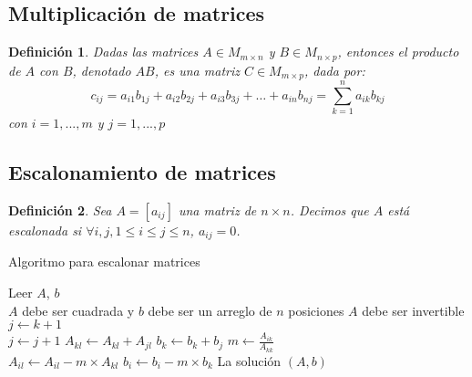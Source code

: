 \documentclass[12pt]{article}
\newtheorem{definition}{Definición}[section]
\begin{document}
        \subsection{Multiplicación de matrices}
        \begin{definition}
            Dadas las matrices $A \in M_{m\times n}$ y $B \in M_{n\times p}$, entonces el producto de $A$ con $B$, denotado $AB$, es una matriz $C \in M_{m\times p}$, dada por: \cite{algebralineal}
            \[
                c_{ij} = a_{i1}b_{1j} + a_{i2}b_{2j} + a_{i3}b_{3j} + \dots + a_{in}b_{nj} = \sum_{k = 1}^{n}{a_{ik}b_{kj}}		
            \]
            con $i = 1, ..., m$ y $j = 1, ..., p$
        \end{definition}

        \subsection{Escalonamiento de matrices}
        \begin{definition}
            Sea $A = [a_{ij}]$ una matriz de $n \times n$. Decimos que $A$ está escalonada si $\forall{i,j}, 1\leq i \leq j \leq n$, $a_{ij} = 0$.
        \end{definition}
        \begin{algorithm}[H]
            \caption{Algoritmo para escalonar matrices}
            Leer $A$, $b$ \\
            {$A$ debe ser cuadrada y $b$ debe ser un arreglo de $n$ posiciones}
            {$A$ debe ser invertible}
            \Else
            {
                {
                    {
                        $j \leftarrow k + 1$\\
                        {
                            $j \leftarrow j + 1$
                        }
                        {
                            {
                                $A_{kl} \leftarrow A_{kl} + A_{jl}$
                            }
                            $b_k \leftarrow b_k + b_j$
                        }
                    }
                    {
                        {
                            $m \leftarrow \frac{A_{ik}}{A_{kk}}$\\
                            {
                                $A_{il} \leftarrow A_{il} - m\times A_{kl}$
                            }
                            $b_i \leftarrow b_i - m \times b_k$
                        }
                    }
                }
            }
            La solución $(A, b)$
        \end{algorithm}
\end{document}
